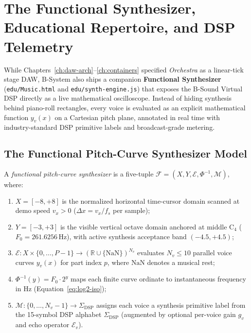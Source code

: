 \chapter{The Functional Synthesizer, Educational Repertoire, and DSP Telemetry}
\label{ch:functional-synth}

While Chapters~\ref{ch:daw-arch}--\ref{ch:containers} specified \emph{Orchestra} as a linear-tick stage DAW, B-System also ships a companion \textbf{Functional Synthesizer} (\texttt{edu/Music.html} and \texttt{edu/synth-engine.js}) that exposes the B-Sound Virtual DSP directly as a live mathematical oscilloscope. Instead of hiding synthesis behind piano-roll rectangles, every voice is evaluated as an explicit mathematical function $y_v(x)$ on a Cartesian pitch plane, annotated in real time with industry-standard DSP primitive labels and broadcast-grade metering.

\section{The Functional Pitch-Curve Synthesizer Model}

\begin{definition}
A \emph{functional pitch-curve synthesizer} is a five-tuple $\mathcal{F} = (X, Y, \mathcal{E}, \Phi^{-1}, \mathcal{M})$, where:
\begin{enumerate}[leftmargin=1.5em]
  \item $X = [-8, +8]$ is the normalized horizontal time-cursor domain scanned at demo speed $v_x > 0$ ($\Delta x = v_x / f_s$ per sample);
  \item $Y = [-3, +3]$ is the visible vertical octave domain anchored at middle $\mathrm{C}_4$ ($F_0 = 261.6256\,\text{Hz}$), with active synthesis acceptance band $(-4.5, +4.5)$;
  \item $\mathcal{E} : X \times \{0, \dots, P-1\} \to (\mathbb{R} \cup \{\mathrm{NaN}\})^{N_v}$ evaluates $N_v \le 10$ parallel voice curves $y_v(x)$ for part index $p$, where $\mathrm{NaN}$ denotes a musical rest;
  \item $\Phi^{-1}(y) = F_0 \cdot 2^y$ maps each finite curve ordinate to instantaneous frequency in Hz (Equation~\ref{eq:log2-iso});
  \item $\mathcal{M} : \{0,\dots,N_v-1\} \to \Sigma_{\mathrm{DSP}}$ assigns each voice a synthesis primitive label from the 15-symbol DSP alphabet $\Sigma_{\mathrm{DSP}}$ (augmented by optional per-voice gain $g_v$ and echo operator $\mathcal{E}_v$).
\end{enumerate}
\end{definition}


